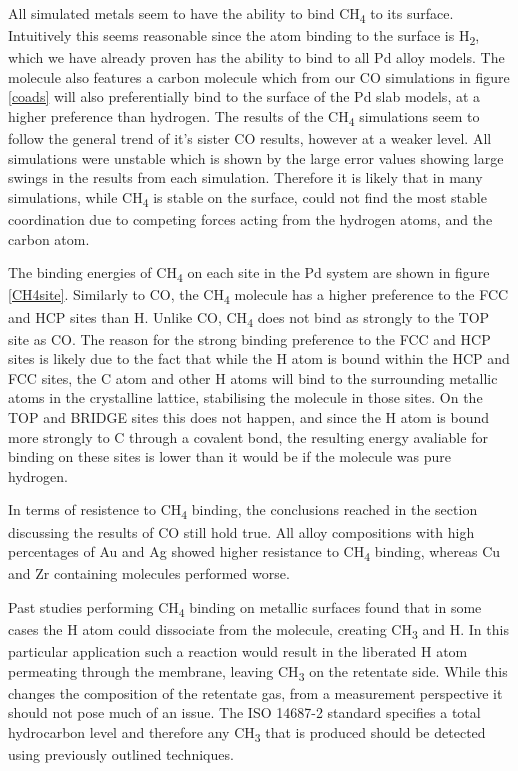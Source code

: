 All simulated metals seem to have the ability to bind CH\textsubscript{4} to its surface. Intuitively this seems reasonable since the atom binding to the surface is H\textsubscript{2}, which we have already proven has the ability to bind to all Pd alloy models. The molecule also features a carbon molecule which from our CO simulations in figure \ref{coads} will also preferentially bind to the surface of the Pd slab models, at a higher preference than hydrogen. The results of the CH\textsubscript{4} simulations seem to follow the general trend of it's sister CO results, however at a weaker level.  All simulations were unstable which is shown by the large error values showing large swings in the results from each simulation. Therefore it is likely that in many simulations, while CH\textsubscript{4} is stable on the surface, could not find the most stable coordination due to competing forces acting from the hydrogen atoms, and the carbon atom. 

The binding energies of CH\textsubscript{4} on each site in the Pd system are shown in figure \ref{CH4site}. Similarly to CO, the CH\textsubscript{4} molecule has a higher preference to the FCC and HCP sites than H. Unlike CO, CH\textsubscript{4} does not bind as strongly to the TOP site as CO. The reason for the strong binding preference to the FCC and HCP sites is likely due to the fact that while the H atom is bound within the HCP and FCC sites, the C atom and other H atoms will bind to the surrounding metallic atoms in the crystalline lattice, stabilising the molecule in those sites. On the TOP and BRIDGE sites this does not happen, and since the H atom is bound more strongly to C through a covalent bond, the resulting energy avaliable for binding on these sites is lower than it would be if the molecule was pure hydrogen. 

In terms of resistence to CH\textsubscript{4} binding, the conclusions reached in the section discussing the results of CO still hold true. All alloy compositions with high percentages of Au and Ag showed higher resistance to CH\textsubscript{4} binding, whereas Cu and Zr containing molecules performed worse. 

Past studies performing CH\textsubscript{4} binding on metallic surfaces found that in some cases the H atom could dissociate from the molecule, creating CH\textsubscript{3} and H. \cite{doi:10.1021/acs.jpcc.8b03184} In this particular application such a reaction would result in the liberated H atom permeating through the membrane, leaving CH\textsubscript{3} on the retentate side. While this changes the composition of the retentate gas, from a measurement perspective it should not pose much of an issue. The ISO 14687-2\cite{InternationalStandardISO14687-2:20122012} standard specifies a total hydrocarbon level and therefore any CH\textsubscript{3} that is produced should be detected using previously outlined techniques. \cite{Murugan2015}

